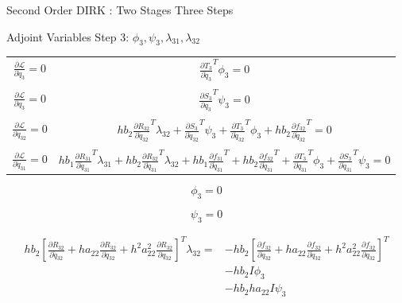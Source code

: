 \documentclass{beamer}
\newcommand{\pd}[2]{\frac{\partial #1}{\partial #2}}
\begin{document}
\begin{frame}[allowframebreaks]{Second Order DIRK : Two Stages Three Steps}
\framebreak

\begin{block}{Adjoint Variables Step 3: $\phi_3,\psi_3,\lambda_{31},\lambda_{32}$}
  \begin{table}[h]
    \centering
    \label{adjoint_step3}
    \begin{tabular}{c|c}
      $\pd{{\mathcal L}}{\dot{q}_{3}}  = 0$  & $ \pd{{T_3}}{\dot{q}_{3}}^T \phi_3 = 0$  \\
      &\\
      $\pd{{\mathcal L}}{{q}_{3}}  = 0$      & $\pd{S_3}{q_3}^T \psi_3 = 0$ \\
      &\\
      $\pd{{\mathcal L}}{\ddot{q}_{32}} = 0$ & $hb_2\pd{R_{32}}{\ddot{q}_{32}}^T\lambda_{32}+ \pd{S_3}{\ddot{q}_{32}}^T \psi_3 + \pd{T_3}{\ddot{q}_{32}}^T \phi_3 + hb_2\pd{f_{32}}{\ddot{q}_{32}}^T = 0$ \\
      &\\
      $\pd{{\mathcal L}}{\ddot{q}_{31}} = 0$ &   $ h b_1 \pd{R_{31}}{\ddot{q}_{31}}^T \lambda_{31} +  h b_2 \pd{R_{32}}{\ddot{q}_{31}}^T \lambda_{32} +  h b_1 \pd{f_{31}}{\ddot{q}_{31}}^T +  h b_2 \pd{f_{32}}{\ddot{q}_{31}}^T  + \pd{T_3}{\ddot{q}_{31}}^T \phi_3 + \pd{S_3}{\ddot{q}_{31}}^T \psi_3 = 0  $ \\
    \end{tabular}
  \end{table}
\end{block}

\framebreak

\begin{equation}
  \phi_3 = 0
\end{equation}

\begin{equation}
  \psi_3 = 0
\end{equation}

\begin{equation}
  \begin{split}
    hb_2\left[\pd{R_{32}}{\ddot{q}_{32}} + ha_{22}\pd{R_{32}}{\dot{q}_{32}} + h^2a_{22}^2 \pd{R_{32}}{{q}_{32}} \right]^T \lambda_{32} = & - hb_2 \left[\pd{f_{32}}{\ddot{q}_{32}} + ha_{22}\pd{f_{32}}{\dot{q}_{32}} + h^2a_{22}^2 \pd{f_{32}}{{q}_{32}} \right]^T \\ 
    & - hb_2 I \phi_3 \\ 
    & - hb_2ha_{22} I  \psi_3
  \end{split}
\end{equation}


\end{frame}
\end{document}
